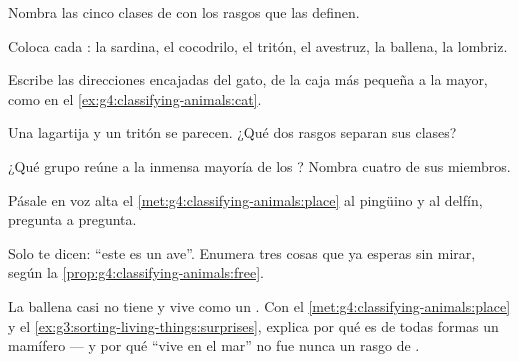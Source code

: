 \begin{exercise}[$\star$]\label{exo:g4:classifying-animals:2}
Nombra las cinco clases de  con los rasgos que las definen.
\end{exercise}

\begin{exercise}[$\star$]\label{exo:g4:classifying-animals:3}
Coloca cada : la sardina, el cocodrilo, el tritón, el avestruz,
la ballena, la lombriz.
\end{exercise}

\begin{exercise}[$\star$]\label{exo:g4:classifying-animals:4}
Escribe las direcciones encajadas del gato, de la caja más pequeña a
la mayor, como en el \cref{ex:g4:classifying-animals:cat}.
\end{exercise}

\begin{exercise}[$\star$]\label{exo:g4:classifying-animals:5}
Una lagartija y un tritón se parecen. ¿Qué dos rasgos separan sus
clases?
\end{exercise}

\begin{exercise}[$\star$]\label{exo:g4:classifying-animals:6}
¿Qué grupo reúne a la inmensa mayoría de los ? Nombra cuatro
de sus miembros.
\end{exercise}

\begin{exercise}[$\star$]\label{exo:g4:classifying-animals:7}
Pásale en voz alta el \cref{met:g4:classifying-animals:place} al
pingüino y al delfín, pregunta a pregunta.
\end{exercise}

\begin{exercise}[$\star$]\label{exo:g4:classifying-animals:8}
Solo te dicen: ``este  es un ave''. Enumera tres cosas que ya
esperas sin mirar, según la \cref{prop:g4:classifying-animals:free}.
\end{exercise}

\begin{exercise}[$\star\star$]\label{exo:g4:classifying-animals:9}
La ballena casi no tiene  y vive como un . Con el
\cref{met:g4:classifying-animals:place} y el
\cref{ex:g3:sorting-living-things:surprises}, explica por qué es de
todas formas un mamífero --- y por qué ``vive en el mar'' no fue nunca
un rasgo de .
\end{exercise}

